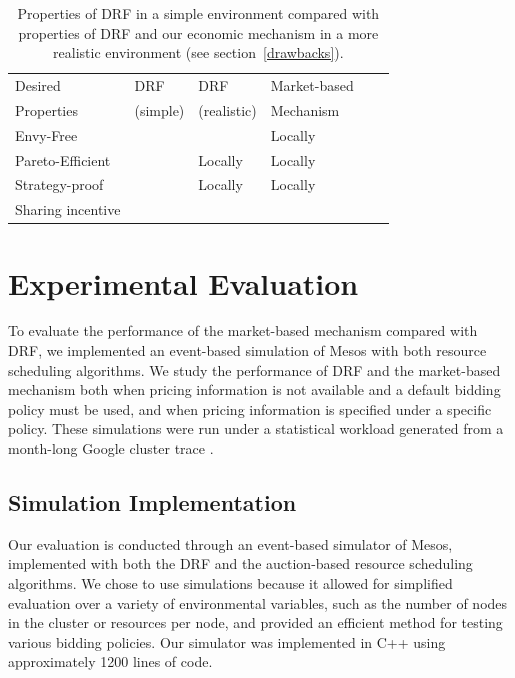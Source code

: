\documentclass{acm_proc_article-sp}
\newcommand{\cmark}{\ding{51}}%
\begin{document}
\begin{table}[t!]
    \begin{tabular}{| l | l | l | l | l | l |}
    \hline
    Desired & \small DRF & \small DRF & \small Market-based  \\
    Properties & \small(simple) & \small (realistic) & \small Mechanism \\
    \hline
    \small Envy-Free & \cmark &  & Locally \\
    \small Pareto-Efficient & \cmark & Locally & Locally  \\
    \small Strategy-proof & \cmark & Locally  & Locally \\
    \small Sharing incentive & \cmark &  & \cmark\\
    \hline
    \end{tabular}
  \caption{Properties of DRF in a simple environment
 compared with properties of DRF and our economic mechanism
 in a more realistic environment (see section~\ref{drawbacks}).}
  \label{table:props}
\end{table}


\section{Experimental Evaluation}
\label{sec:eval}

To evaluate the performance of the market-based mechanism compared with DRF,
we implemented an event-based simulation of Mesos with both resource scheduling algorithms.
We study the performance of DRF and the market-based mechanism both when pricing information is not available and a default bidding policy must be used, and when pricing information is specified under a specific policy. These simulations were run under a statistical workload generated from a month-long Google cluster trace \cite{TODO}.

\subsection{Simulation Implementation\\}

Our evaluation is conducted through an event-based simulator of Mesos, implemented with both the DRF and the auction-based resource scheduling algorithms. We chose to use simulations because it allowed for simplified evaluation over a variety of environmental variables, such as the number of nodes in the cluster or resources per node, and provided an efficient method for testing various bidding policies. Our simulator was implemented in C++ using approximately 1200 lines of code.
\end{document}
